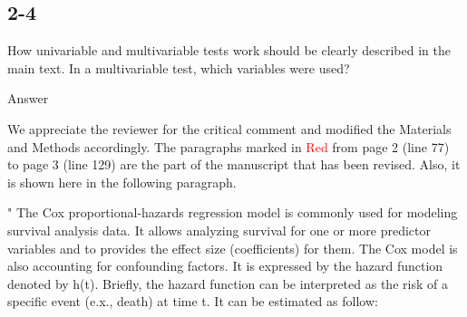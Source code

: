 \documentclass[preprint,12pt]{elsarticle}
\newenvironment{MyIndent}
{\par\leftskip1cm\relax\rightskip1cm\relax}
{\par\leftskip0cm\relax\rightskip0cm\relax}
\newenvironment{MyColorPar}[1]{%
    \leavevmode\color{#1}\ignorespaces%
}{%
}%
\begin{document}
\begin{MyColorPar}{blue}
\begin{MyIndent}
\begin{MyColorPar}{red}
\end{MyColorPar} %
\end{MyIndent}

\end{MyColorPar} %



\subsection*{2-4} %
How univariable and multivariable tests work should be clearly described in the main text. In a multivariable test, which variables were used?




%
\begin{MyColorPar}{blue}
Answer

We appreciate the reviewer for the critical comment and modified the Materials and Methods accordingly.
The paragraphs marked in \textcolor{red}{Red} from page 2 (line 77) to page 3 (line 129) are the part of the manuscript that has been revised. Also, it is shown here in the following paragraph.
\\[0.3cm]

\begin{MyIndent}
\begin{MyColorPar}{red}
"
The Cox proportional-hazards regression model\cite{Cox1972}\cite{Andersen1982} is commonly used for modeling survival analysis data. It allows analyzing survival for one or more predictor variables and to provides the effect size (coefficients) for them\cite{Bradburn2003b}. %
The Cox model is also accounting for confounding factors\cite{Magen2019}.
It is expressed by the hazard function denoted by h(t). Briefly, the hazard function can be interpreted as the risk of a specific event (e.x., death) at time t. It can be estimated as follow:

\begin{flushleft}


\end{flushleft}
\end{MyColorPar}
\end{MyIndent}
\end{MyColorPar}
\end{document}
